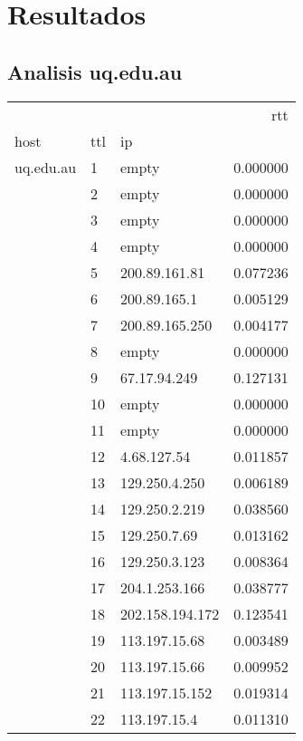 \newpage
\section{Resultados}
\subsection{Analisis uq.edu.au}
\begin{center}
\begin{tabular}{lllr}
\toprule
              &    &                &       rtt \\
host & ttl & ip &           \\
\midrule
uq.edu.au & 1  & empty &  0.000000 \\
              & 2  & empty &  0.000000 \\
              & 3  & empty &  0.000000 \\
              & 4  & empty &  0.000000 \\
              & 5  & 200.89.161.81 &  0.077236 \\
              & 6  & 200.89.165.1 &  0.005129 \\
              & 7  & 200.89.165.250 &  0.004177 \\
              & 8  & empty &  0.000000 \\
              & 9  & 67.17.94.249 &  0.127131 \\
              & 10 & empty &  0.000000 \\
              & 11 & empty &  0.000000 \\
              & 12 & 4.68.127.54 &  0.011857 \\
              & 13 & 129.250.4.250 &  0.006189 \\
              & 14 & 129.250.2.219 &  0.038560 \\
              & 15 & 129.250.7.69 &  0.013162 \\
              & 16 & 129.250.3.123 &  0.008364 \\
              & 17 & 204.1.253.166 &  0.038777 \\
              & 18 & 202.158.194.172 &  0.123541 \\
              & 19 & 113.197.15.68 &  0.003489 \\
              & 20 & 113.197.15.66 &  0.009952 \\
              & 21 & 113.197.15.152 &  0.019314 \\
              & 22 & 113.197.15.4 &  0.011310 \\

\end{tabular}
\end{center}
